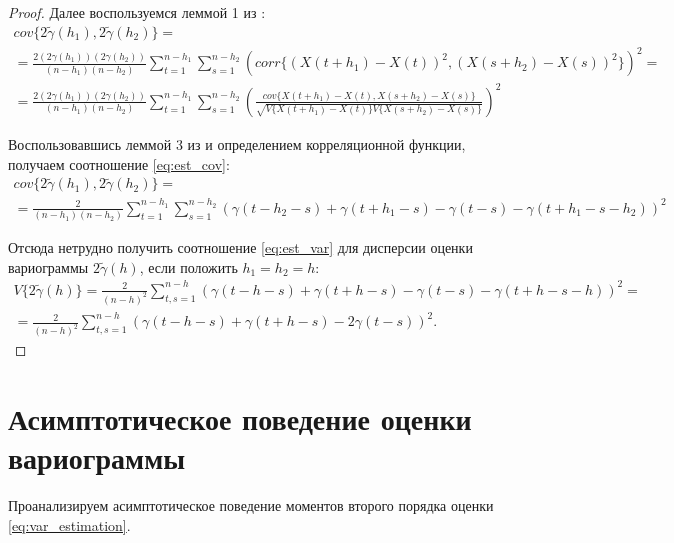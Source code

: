 \begin{proof}
Далее воспользуемся леммой 1 из \cite{tsekhavaya-brest}:
\begin{multline*}
	cov\{ 2 \tilde{\gamma}(h_1), 2 \tilde{\gamma}(h_2) \} = \\
	= \frac{2 (2\gamma(h_1))(2\gamma(h_2))}{(n - h_1)(n - h_2)} \sum_{t = 1}^{n - h_1}\sum_{s = 1}^{n - h_2} (corr\{(X(t + h_1) - X(t))^2, (X(s + h_2) - X(s))^2 \})^2 = \\
	= \frac{2 (2\gamma(h_1))(2\gamma(h_2))}{(n - h_1)(n - h_2)}\sum_{t = 1}^{n - h_1}\sum_{s = 1}^{n - h_2} ( \frac{cov\{ X(t + h_1) - X(t), X(s + h_2) - X(s) \}}{\sqrt{V\{ X( t + h_1) - X(t) \} V\{ X(s + h_2) - X(s) \}}} )^2
\end{multline*}

Воспользовавшись леммой 3 из \cite{tsekhavaya-brest} и определением корреляционной функции, получаем соотношение \eqref{eq:est_cov}:
\begin{eqnarray}
\nonumber
\label{eq:cov_base}
	cov\{ 2 \tilde{\gamma}(h_1), 2 \tilde{\gamma}(h_2) \} = \\
	= \frac{2}{(n - h_1)(n - h_2)} \sum_{t = 1}^{n - h_1}\sum_{s = 1}^{n - h_2} (\gamma(t - h_2 - s) + \gamma(t + h_1 - s) - \gamma(t - s) - \gamma(t + h_1 - s - h_2))^2
\end{eqnarray}

Отсюда нетрудно получить соотношение \eqref{eq:est_var} для дисперсии оценки вариограммы $ 2 \tilde{\gamma}(h) $, если положить $ h_1 = h_2 = h $:
\begin{multline*}
\nonumber
	V \{ 2 \tilde{\gamma}(h) \} = \frac{2}{(n - h)^2}\sum_{t,s = 1}^{n - h} ( \gamma(t - h - s) + \gamma(t + h - s) - \gamma(t - s) - \gamma(t + h - s - h) )^2 = \\
	= \frac{2}{(n-h)^2}\sum_{t,s = 1}^{n - h} ( \gamma(t - h - s) + \gamma(t + h - s) - 2\gamma(t - s) )^2.
\end{multline*}

\end{proof}

\section{Асимптотическое поведение оценки вариограммы} %
\label{sec:new_section}

Проанализируем асимптотическое поведение моментов второго порядка оценки \eqref{eq:var_estimation}.

